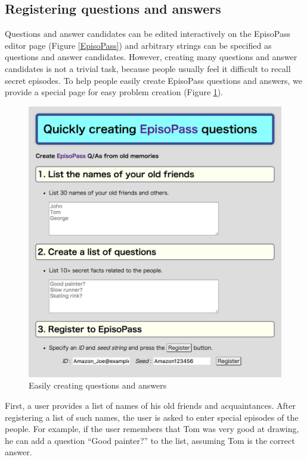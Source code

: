 \documentclass[sigconf]{acmart}
\begin{document}
\subsection{Registering questions and answers}
\label{easyregister}

Questions and answer candidates can be edited interactively on the
EpisoPass editor page (Figure \ref{EpisoPass}) and arbitrary
strings can be specified as questions and answer candidates.
However, creating many questions and answer candidates is not a
trivial task, because
people usually feel it difficult to recall secret episodes.
%
To help people easily create EpisoPass questions and answers,
we provide a special page for easy problem creation
(Figure \ref{Easy}).

\begin{figure}[H]
  \includegraphics[width=12cm,bb=0 0 1678 1728]{figures/Easy.png}
  \caption{Easily creating questions and answers}
  \label{Easy}
\end{figure}

First, a user provides a list of names of his old friends and acquaintances.
After registering a list of such names,
the user is asked to enter special episodes of the people.
For example, if the user remembers that Tom was
very good at drawing, he can add a question
``Good painter?'' to the list, assuming Tom is the correct answer.
\end{document}
